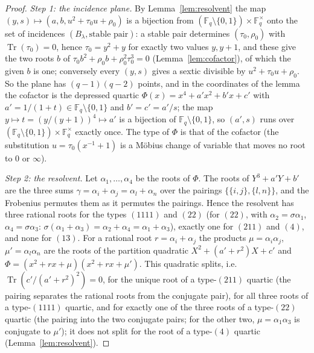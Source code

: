 \documentclass[12pt,a4paper]{amsart}
\theoremstyle{definition}
\newcommand{\F}{\mathbb{F}}
\newcommand{\Tr}{\operatorname{Tr}}
\begin{document}
\begin{proof}
\emph{Step 1: the incidence plane.} By Lemma~\ref{lem:resolvent} the map $(y,s)\mapsto(a,b,u^2+\tau_0u+\rho_0)$ is a bijection from $(\F_q\setminus\{0,1\})\times\F_q^\times$ onto the set of incidences $(B_\lambda,\text{stable pair})$: a stable pair determines $(\tau_0,\rho_0)$ with $\Tr(\tau_0)=0$, hence $\tau_0=y^2+y$ for exactly two values $y,y+1$, and these give the two roots $b$ of $\tau_0b^2+\rho_0b+\rho_0^2\tau_0^3=0$ (Lemma~\ref{lem:cofactor}), of which the given $b$ is one; conversely every $(y,s)$ gives a sextic divisible by $u^2+\tau_0u+\rho_0$. So the plane has $(q-1)(q-2)$ points, and in the coordinates of the lemma the cofactor is the depressed quartic $\Phi(x)=x^4+a'x^2+b'x+c'$ with $a'=1/(1+t)\in\F_q\setminus\{0,1\}$ and $b'=c'=a'/s$; the map $y\mapsto t=(y/(y+1))^4\mapsto a'$ is a bijection of $\F_q\setminus\{0,1\}$, so $(a',s)$ runs over $(\F_q\setminus\{0,1\})\times\F_q^\times$ exactly once. The type of $\Phi$ is that of the cofactor (the substitution $u=\tau_0(x^{-1}+1)$ is a M\"obius change of variable that moves no root to $0$ or $\infty$).

\emph{Step 2: the resolvent.} Let $\alpha_1,\dots,\alpha_4$ be the roots of $\Phi$. The roots of $Y^3+a'Y+b'$ are the three sums $\gamma=\alpha_i+\alpha_j=\alpha_l+\alpha_n$ over the pairings $\{\{i,j\},\{l,n\}\}$, and the Frobenius permutes them as it permutes the pairings. Hence the resolvent has three rational roots for the types $(1111)$ and $(22)$ (for $(22)$, with $\alpha_2=\sigma\alpha_1$, $\alpha_4=\sigma\alpha_3$: $\sigma(\alpha_1+\alpha_3)=\alpha_2+\alpha_4=\alpha_1+\alpha_3$), exactly one for $(211)$ and $(4)$, and none for $(13)$. For a rational root $r=\alpha_i+\alpha_j$ the products $\mu=\alpha_i\alpha_j$, $\mu'=\alpha_l\alpha_n$ are the roots of the partition quadratic $X^2+(a'+r^2)X+c'$ and $\Phi=(x^2+rx+\mu)(x^2+rx+\mu')$. This quadratic splits, i.e.\ $\Tr(c'/(a'+r^2)^2)=0$, for the unique root of a type-$(211)$ quartic (the pairing separates the rational roots from the conjugate pair), for all three roots of a type-$(1111)$ quartic, and for exactly one of the three roots of a type-$(22)$ quartic (the pairing into the two conjugate pairs; for the other two, $\mu=\alpha_1\alpha_3$ is conjugate to $\mu'$); it does not split for the root of a type-$(4)$ quartic (Lemma~\ref{lem:resolvent}).


\end{proof}
\end{document}
